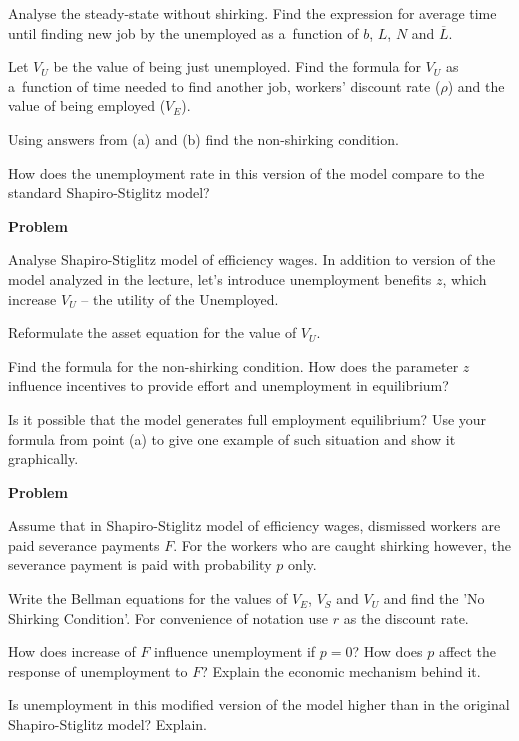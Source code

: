 \documentclass[a4paper, notitlepage, 11pt]{article}
\newcounter{zadlicz}[section]%
\newcommand{\tytul}[2]{\setcounter{equation}{0}\addtocounter{zadlicz}{1}\vspace{\abovedisplayskip}\noindent\textbf{#1\ \thezadlicz #2}}%
\begin{document}
\begin{wylicz}
 \item Analyse the steady-state without shirking. Find the expression for average time until finding new job by the unemployed as a~function of $b$, $L$, $N$ and  $\overline L$.
 \item Let $V_U$ be the value of being just unemployed. Find the formula for $V_U$ as a~function of time needed to find another job, workers' discount rate ($\rho$) and the value of being employed ($V_E$).
 \item Using answers from (a) and (b) find the non-shirking condition.
 \item How does the unemployment rate in this version of the model compare to the standard Shapiro-Stiglitz model?
\end{wylicz}

\tytul{Problem}{}

\noindent%
Analyse Shapiro-Stiglitz model of efficiency wages. In addition to version of the model analyzed in the lecture, let's introduce unemployment benefits $z$, which increase $V_U$ -- the utility of the Unemployed.

\begin{wylicz}
\item Reformulate the asset equation for the value of $V_U$.
\item Find the formula for the non-shirking condition. How does the parameter $z$ influence incentives to provide effort and unemployment in equilibrium?
\item Is it possible that the model generates full employment equilibrium? Use your formula from point (a) to give one example of such situation and show it graphically.
\end{wylicz}

\newpage%
\tytul{Problem}{}

\noindent%
Assume that in Shapiro-Stiglitz model of efficiency wages, dismissed workers are paid severance payments $F$. For the workers who are caught shirking however, the severance payment is paid with probability $p$ only.

\begin{wylicz}
\item Write the Bellman equations for the values of $V_E$, $V_S$ and $V_U$ and find the 'No Shirking Condition'. For convenience of notation use $r$ as the discount rate.
\item How does increase of $F$ influence unemployment if $p=0$? How does $p$ affect the response of unemployment to $F$? Explain the economic mechanism behind it.
\item Is unemployment in this modified version of the model higher than in the original Shapiro-Stiglitz model? Explain.
\end{wylicz}
\end{document}

